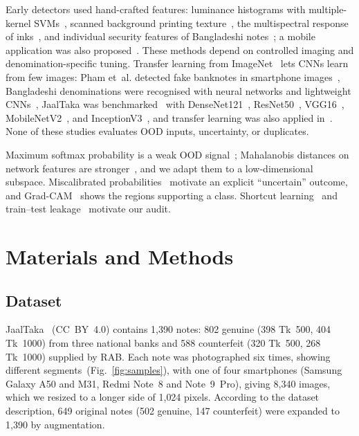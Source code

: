 \documentclass[pdflatex,iicol,sn-mathphys-num]{sn-jnl}
\begin{document}
Early detectors used hand-crafted features: luminance histograms with multiple-kernel
SVMs~\cite{yeh2011}, scanned background printing texture~\cite{berenguel2016}, the
multispectral response of inks~\cite{baek2018}, and individual security features of
Bangladeshi notes~\cite{uddin2016}; a mobile application was also
proposed~\cite{dittimi2018}. These methods depend on controlled imaging and
denomination-specific tuning. Transfer learning from
ImageNet~\cite{deng2009imagenet,yosinski2014transferable} lets CNNs learn from few
images: Pham et~al. detected fake banknotes in smartphone images~\cite{pham2020,pham2022},
Bangladeshi denominations were recognised with neural networks and lightweight
CNNs~\cite{jahangir2007,linkon2020}, JaalTaka was benchmarked~\cite{piyas2025jaaltaka}
with DenseNet121~\cite{huang2017densenet}, ResNet50~\cite{he2016resnet},
VGG16~\cite{simonyan2015vgg}, MobileNetV2~\cite{sandler2018mobilenetv2}, and
InceptionV3~\cite{szegedy2016inception}, and transfer learning was also applied
in~\cite{tabassum2025}. None of these studies evaluates OOD inputs, uncertainty, or
duplicates.

Maximum softmax probability is a weak OOD signal~\cite{hendrycks2017baseline};
Mahalanobis distances on network features are stronger~\cite{lee2018mahalanobis}, and we
adapt them to a low-dimensional subspace. Miscalibrated
probabilities~\cite{guo2017calibration} motivate an explicit ``uncertain'' outcome, and
Grad-CAM~\cite{selvaraju2017gradcam} shows the regions supporting a class. Shortcut
learning~\cite{geirhos2020shortcut} and train--test leakage~\cite{kapoor2023leakage}
motivate our audit.

\section{Materials and Methods}\label{sec:method}

\subsection{Dataset}\label{sec:data}

JaalTaka~\cite{piyas2025jaaltaka,jaaltaka_data} (CC~BY~4.0) contains 1{,}390 notes:
802 genuine (398 Tk~500, 404 Tk~1000) from three national banks and 588 counterfeit
(320 Tk~500, 268 Tk~1000) supplied by RAB. Each note was photographed six times, showing
different segments~(Fig.~\ref{fig:samples}), with one of four smartphones (Samsung Galaxy
A50 and M31, Redmi Note~8 and Note~9~Pro), giving 8{,}340 images, which we resized to a
longer side of 1{,}024 pixels. According to the dataset description, 649 original notes
(502 genuine, 147 counterfeit) were expanded to 1{,}390 by augmentation.
\end{document}
